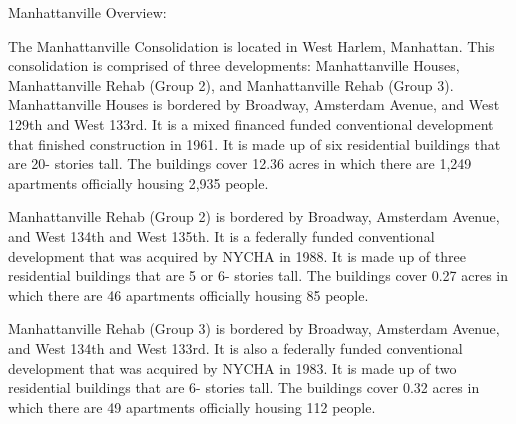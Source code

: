 Manhattanville Overview:   

 

The Manhattanville Consolidation is located in West Harlem, Manhattan. This consolidation is comprised of three developments: Manhattanville Houses, Manhattanville Rehab (Group 2), and Manhattanville Rehab (Group 3). Manhattanville Houses is bordered by Broadway, Amsterdam Avenue, and West 129th and West 133rd. It is a mixed financed funded conventional development that finished construction in 1961. It is made up of six residential buildings that are 20- stories tall. The buildings cover 12.36 acres in which there are 1,249 apartments officially housing 2,935 people.    

   

Manhattanville Rehab (Group 2) is bordered by Broadway, Amsterdam Avenue, and West 134th and West 135th. It is a federally funded conventional development that was acquired by NYCHA in 1988. It is made up of three residential buildings that are 5 or 6- stories tall. The buildings cover 0.27 acres in which there are 46 apartments officially housing 85 people.    



Manhattanville Rehab (Group 3) is bordered by Broadway, Amsterdam Avenue, and West 134th and West 133rd. It is also a federally funded conventional development that was acquired by NYCHA in 1983. It is made up of two residential buildings that are 6- stories tall. The buildings cover 0.32 acres in which there are 49 apartments officially housing 112 people.